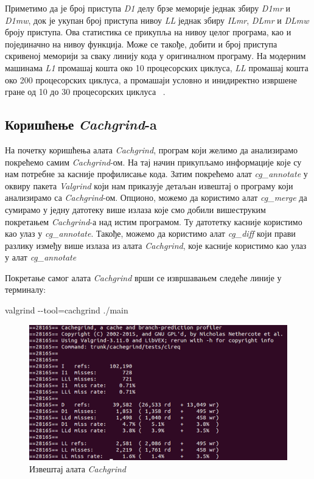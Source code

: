 \documentclass[12pt,oneside]{memoir}
\begin{document}
\indent Приметимо да је број приступа \textit{D1} делу брзе меморије једнак збиру \textit{D1mr} и \textit{D1mw}, док је укупан број приступа нивоу \textit{LL} једнак збиру  \textit{ILmr}, \textit{DLmr} и \textit{DLmw} броју приступа. Ова статистика се прикупља на нивоу целог програма, као и појединачно на нивоу функција. Може се такође, добити и број приступа скривеној меморији за сваку линију кода у оригиналном програму. На модерним машинама \textit{L1} промашај кошта око 10 процесорских циклуса, \textit{LL} промашај кошта око 200 процесорских циклуса, а промашаји условно и инидиректно извршене гране од 10 до 30 процесорских циклуса ~\cite{cachegrindRef}.

\subsection{Коришћење \textit{Cachgrind}-a}

\indent На почетку коришћења алата \textit{Cachgrind}, програм који желимо да анализирамо покрећемо самим \textit{Cachgrind}-ом. На тај начин прикупљамо информације које су нам потребне за касније профилисање кода. Затим покрећемо алат \textit{cg\_annotate} у оквиру пакета \textit{Valgrind} који нам приказује детаљан извештај о програму који анализирамо са \textit{Cachgrind}-ом. Опционо, можемо да користимо алат \textit{cg\_merge} да сумирамо у једну датотеку више излаза које смо добили вишеструким покретањем \textit{Cachgrind}-а над истим програмом. Ту датотетку касније користимо као улаз у \textit{cg\_annotate}. Такође, можемо да користимо алат \textit{cg\_diff} који прави разлику између више излаза из алата \textit{Cachgrind}, које касније користимо као улаз у алат \textit{cg\_annotate}

\indent Покретање самог алата \textit{Cachgrind} врши се извршавањем следеће линије у терминалу:

\begin{center}
 valgrind -\--tool=cachgrind ./main
\end{center}


\begin{figure}[h!]
\begin{center}
\includegraphics[scale=0.75]{slika10.png}
\end{center}
\caption{Извештај алата \textit{Cachgrind}}
\label{fig:cachgrind}
\end{figure}
\end{document}
